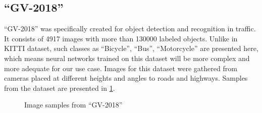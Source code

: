 \documentclass[twoside]{ctuthesis}
\theoremstyle{plain}
\theoremstyle{definition}
\theoremstyle{note}
\begin{document}
\subsection{``GV-2018''}
``GV-2018'' was specifically created for object detection and recognition in traffic. It consists of 4917 images with more than 130000 labeled objects. Unlike in KITTI dataset, such classes as ``Bicycle'', ``Bus'', ``Motorcycle'' are presented here, which means neural networks trained on this dataset will be more complex and more adequate for our use case.  Images for this dataset were gathered from cameras placed at different heights and angles to roads and highways. Samples from the dataset are presented in \ref{fig:goodvision-samples}.

\begin{figure}[hbt]
        \centering
        
        \centering
                \caption{Image samples from ``GV-2018''}
                \label{fig:goodvision-samples}
\end{figure}
\end{document}
